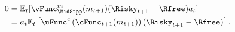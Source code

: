   \begin{equation}\begin{gathered}\begin{aligned}
        0  & = \Ex_{t}[{\vFunc}_{\MidStpp}^{m}(m_{t+1})(\Risky_{t+1}-\Rfree){a}_{t}] \notag
        \\         & = a_{t}\Ex_{t}\left[\uFunc^{c}\left(\cFunc_{t+1}(m_{t+1})\right)(\Risky_{t+1}-\Rfree)\right] \label{eq:FOCw}.
      \end{aligned}\end{gathered}\end{equation}
